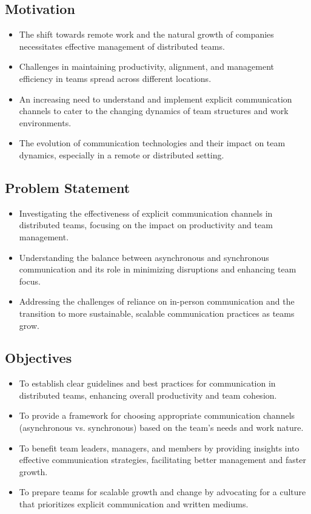 \documentclass[12pt]{article}
\begin{document}
\subsection{Motivation}
\begin{itemize}
  \item The shift towards remote work and the natural growth of companies necessitates effective management of distributed teams.
  \item Challenges in maintaining productivity, alignment, and management efficiency in teams spread across different locations.
  \item An increasing need to understand and implement explicit communication channels to cater to the changing dynamics of team structures and work environments.
  \item The evolution of communication technologies and their impact on team dynamics, especially in a remote or distributed setting.
\end{itemize}

\subsection{Problem Statement}
\begin{itemize}
  \item Investigating the effectiveness of explicit communication channels in distributed teams, focusing on the impact on productivity and team management.
  \item Understanding the balance between asynchronous and synchronous communication and its role in minimizing disruptions and enhancing team focus.
  \item Addressing the challenges of reliance on in-person communication and the transition to more sustainable, scalable communication practices as teams grow.
\end{itemize}

\subsection{Objectives}
\begin{itemize}
  \item To establish clear guidelines and best practices for communication in distributed teams, enhancing overall productivity and team cohesion.
  \item To provide a framework for choosing appropriate communication channels (asynchronous vs. synchronous) based on the team's needs and work nature.
  \item To benefit team leaders, managers, and members by providing insights into effective communication strategies, facilitating better management and faster growth.
  \item To prepare teams for scalable growth and change by advocating for a culture that prioritizes explicit communication and written mediums.
\end{itemize}
\end{document}
